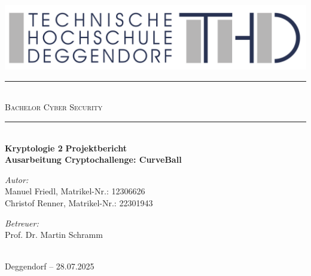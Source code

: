 \documentclass{article}
\begin{document}
\begin{titlepage}
  \begin{center}
    \includegraphics[width=\textwidth]{THD-Logo.pdf}
    \vspace{1cm}
    \rule{1\textwidth}{1mm} \\[0.3cm]
    \textsc{\scshape \huge Bachelor Cyber Security}\\
    \rule{1\textwidth}{1mm} \\[2cm]
    {
      \vspace{1cm}
      \Large \textbf{Kryptologie 2}
      \vspace{3cm}
      \Large \textbf{Projektbericht}
    }\\[0.5cm]
    \LARGE \textbf{Ausarbeitung Cryptochallenge: CurveBall}\\[2cm]
    \begin{minipage}[t]{0.4\textwidth}
      \begin{flushleft}
        \normalsize \emph{Autor:}\\[0.3cm]
        Manuel Friedl, Matrikel-Nr.: 12306626\\
        Christof Renner, Matrikel-Nr.: 22301943
      \end{flushleft}
    \end{minipage}
    \begin{minipage}[t]{0.5\textwidth}
      \begin{flushright}
        \normalsize \emph{Betreuer:}\\[0.3cm]
        Prof. Dr. Martin Schramm
      \end{flushright}
    \end{minipage}\\[3cm]
    {\large Deggendorf – 28.07.2025\\}
  \end{center}
\end{titlepage}

\newpage
{}
\thispagestyle{empty}

\newpage
\tableofcontents
\thispagestyle{empty}
\newpage

\setcounter{page}{1}
\end{document}
